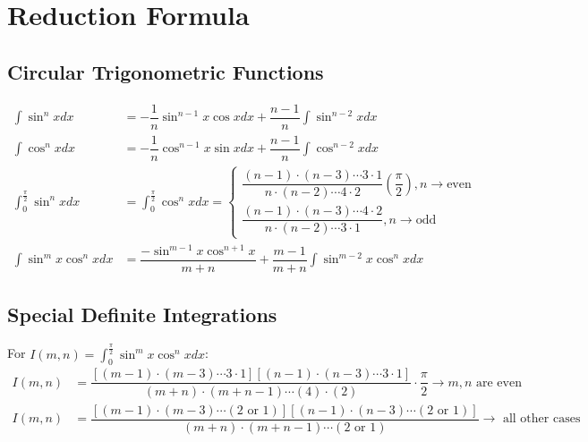 \documentclass[../main.tex]{subfile}
\begin{document}
    \chapter{Reduction Formula}
    \section{Circular Trigonometric Functions}
        \begin{align}
            \int \sin^n x dx & = -\dfrac{1}{n} \sin^{n-1} x \cos x dx + \dfrac{n-1}{n} \int \sin^{n - 2} x dx \\
            \int \cos^n x dx & = -\dfrac{1}{n} \cos^{n-1} x \sin x dx + \dfrac{n-1}{n} \int \cos^{n-2} x dx \\
            \int_0^{\frac{\pi}{2}} \sin^n x dx & = \int_0^{ \frac{\pi}{2} } \cos^n x dx =
                \begin{cases}
                    \dfrac{(n-1)\cdot(n-3)\cdots 3\cdot1}{n\cdot(n-2)\cdots 4\cdot 2}\left(\dfrac{\pi}{2}\right), n\rightarrow \text{even}\\
                    \dfrac{(n-1)\cdot(n-3)\cdots 4\cdot2}{n\cdot(n-2)\cdots 3\cdot 1}, n\rightarrow \text{odd}
                \end{cases}\\
            \int \sin^m x \cos^n x dx & = \dfrac{-\sin^{m - 1} x \cos^{n + 1} x}{m + n} + \dfrac{m - 1}{m + n} \int \sin^{m-2} x \cos^n x dx
        \end{align}
        
        \section{Special Definite Integrations}
        For $I(m,n)=\int_0^{\frac{\pi}{2}} \sin^m x\cos^n x dx$:
        \begin{align}
            I(m,n) & = \dfrac{[(m - 1) \cdot (m - 3) \cdots 3 \cdot 1][(n - 1) \cdot (n - 3) \cdots 3 \cdot 1]}{(m + n) \cdot (m + n - 1) \cdots (4) \cdot (2)} \cdot \dfrac{\pi}{2} \rightarrow m,n \text{ are even}\\
            I(m,n) & = \dfrac{[(m - 1) \cdot (m - 3) \cdots (2\text{ or }1)][(n - 1) \cdot (n-3) \cdots (2\text{ or }1)]}{(m + n) \cdot (m + n - 1) \cdots (2\text{ or }1)} \rightarrow \text{ all other cases}\\
        \end{align}
\end{document}
